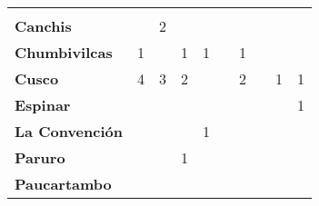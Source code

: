 \begin{tabular}{lccccccccc}
	&\cellcolor[HTML]{FCC46C} 					&\cellcolor[HTML]{FCC46C} 		&\cellcolor[HTML]{FCC46C}\\
	\textbf{Canchis}                            
	&\cellcolor[HTML]{FCC46C}                   &2         							&\cellcolor[HTML]{FCC46C}                	&\cellcolor[HTML]{FCC46C}              		&\cellcolor[HTML]{FCC46C} 		  			&\cellcolor[HTML]{FCC46C} 
	&\cellcolor[HTML]{FCC46C}   				&\cellcolor[HTML]{FCC46C} 								&\cellcolor[HTML]{FCC46C}\\
	\textbf{Chumbivilcas}                      
	&1                   						&\cellcolor[HTML]{FCC46C}                    						&1                  &1                  	&\cellcolor[HTML]{FCC46C}       &1
	&\cellcolor[HTML]{FCC46C}   			    &\cellcolor[HTML]{FCC46C}
	&\cellcolor[HTML]{FCC46C}					\\
	\textbf{Cusco}                             
	&4                                          &3                    			&2                  
	&\cellcolor[HTML]{FCC46C}                   &\cellcolor[HTML]{FCC46C}    	 
	&2 											&\cellcolor[HTML]{FCC46C} 		 
	&1											&1\\
	\textbf{Espinar}       					                 						   
	&\cellcolor[HTML]{FCC46C}                   &\cellcolor[HTML]{FCC46C}        &\cellcolor[HTML]{FCC46C}                   &\cellcolor[HTML]{FCC46C}                   &\cellcolor[HTML]{FCC46C}  		 			&\cellcolor[HTML]{FCC46C} 
	&\cellcolor[HTML]{FCC46C} 					&\cellcolor[HTML]{FCC46C} 		 
	&1\\
	\textbf{La Convención}                                                   			&\cellcolor[HTML]{FCC46C}                   &\cellcolor[HTML]{FCC46C}                   &\cellcolor[HTML]{FCC46C}                   &1                   			&\cellcolor[HTML]{FCC46C}              		&\cellcolor[HTML]{FCC46C} 					&\cellcolor[HTML]{FCC46C}
	&\cellcolor[HTML]{FCC46C}  					&\cellcolor[HTML]{FCC46C} 		\\
	\textbf{Paruro}                            
	&\cellcolor[HTML]{FCC46C}       	 		&\cellcolor[HTML]{FCC46C}              	    &1                   &\cellcolor[HTML]{FCC46C}              	    &\cellcolor[HTML]{FCC46C}        
	&\cellcolor[HTML]{FCC46C}                   &\cellcolor[HTML]{FCC46C}   				
	&\cellcolor[HTML]{FCC46C} 					&\cellcolor[HTML]{FCC46C}		 \\
	\textbf{Paucartambo}               		   
	&\cellcolor[HTML]{FCC46C}                      
	&\cellcolor[HTML]{FCC46C}                   &\cellcolor[HTML]{FCC46C}       &\cellcolor[HTML]{FCC46C}                      

\end{tabular}
